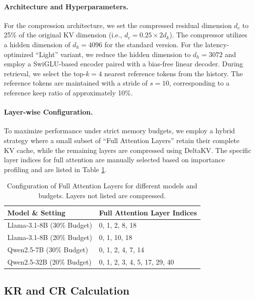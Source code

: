 \paragraph{Architecture and Hyperparameters.}
For the compression architecture, we set the compressed residual dimension $d_c$ to 25\% of the original KV dimension (i.e., $d_c = 0.25 \times 2d_k$). The compressor utilizes a hidden dimension of $d_h = 4096$ for the standard version. For the latency-optimized ``Light'' variant, we reduce the hidden dimension to $d_h = 3072$ and employ a SwiGLU-based encoder paired with a bias-free linear decoder. During retrieval, we select the top-$k=4$ nearest reference tokens from the history. The reference tokens are maintained with a stride of $s=10$, corresponding to a reference keep ratio of approximately 10\%.

\paragraph{Layer-wise Configuration.}
To maximize performance under strict memory budgets, we employ a hybrid strategy where a small subset of ``Full Attention Layers'' retain their complete KV cache, while the remaining layers are compressed using DeltaKV. The specific layer indices for full attention are manually selected based on importance profiling and are listed in Table \ref{tab:full_attn_layers_config}.

\begin{table}[t]
    \centering
    \caption{Configuration of Full Attention Layers for different models and budgets. Layers not listed are compressed.}
    \label{tab:full_attn_layers_config}
    \begin{tabular}{ll}
        \toprule
        \rowcolor[HTML]{FFF2CC}
        \textbf{Model \& Setting} & \textbf{Full Attention Layer Indices} \\
        \midrule
        Llama-3.1-8B (30\% Budget) & 0, 1, 2, 8, 18 \\
        Llama-3.1-8B (20\% Budget) & 0, 1, 10, 18 \\
        Qwen2.5-7B (30\% Budget) & 0, 1, 2, 4, 7, 14 \\
        Qwen2.5-32B (20\% Budget) & 0, 1, 2, 3, 4, 5, 17, 29, 40 \\
        \bottomrule
    \end{tabular}%
\end{table}


\subsection{KR and CR Calculation}
\label{app:sect:kr_cr}

